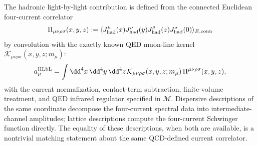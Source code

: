\begin{definition}
\label{def:sm-muon-hlbl-coordinate}
The hadronic light-by-light contribution is defined from the connected
Euclidean four-current correlator
\begin{equation}
  \Pi_{\mu\nu\rho\sigma}(x,y,z)
  :=
  \langle
    J_{\rm had}^\mu(x)J_{\rm had}^\nu(y)
    J_{\rm had}^\rho(z)J_{\rm had}^\sigma(0)
  \rangle_{E,\rm conn}
  \label{eq:sm-hlbl-four-current}
\end{equation}
by convolution with the exactly known QED muon-line kernel
\(\mathcal K_{\mu\nu\rho\sigma}(x,y,z;m_\mu)\):
\begin{equation}
  a_\mu^{\rm HLbL}
  =
  \int \dd^4x\,\dd^4y\,\dd^4z\,
  \mathcal K_{\mu\nu\rho\sigma}(x,y,z;m_\mu)\,
  \Pi^{\mu\nu\rho\sigma}(x,y,z),
  \label{eq:sm-hlbl-master-coordinate}
\end{equation}
with the current normalization, contact-term subtraction, finite-volume
treatment, and QED infrared regulator specified in \(\mathcal M\).  Dispersive
descriptions of the same coordinate decompose the four-current spectral data
into intermediate-channel amplitudes; lattice descriptions compute the
four-current Schwinger function directly.  The equality of these descriptions,
when both are available, is a nontrivial matching statement about the same
QCD-defined current correlator.
\end{definition}

